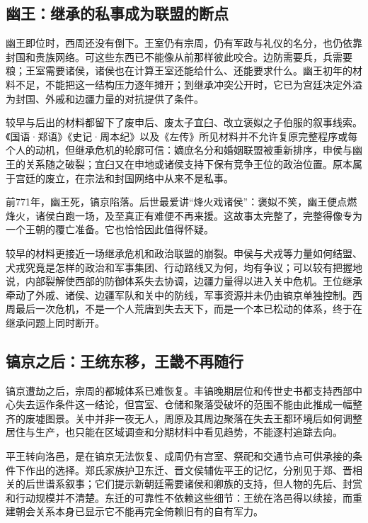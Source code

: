 \subsection{幽王：继承的私事成为联盟的断点}

幽王即位时，西周还没有倒下。王室仍有宗周，仍有军政与礼仪的名分，也仍依靠封国和贵族网络。可这些东西已不能像从前那样彼此咬合。边防需要兵，兵需要粮；王室需要诸侯，诸侯也在计算王室还能给什么、还能要求什么。幽王初年的材料不足，不能把这一结构压力逐年摊开；到继承冲突公开时，它已为宫廷决定外溢为封国、外戚和边疆力量的对抗提供了条件。

较早与后出的材料都留下了废申后、废太子宜臼、改立褒姒之子伯服的叙事线索。《国语·郑语》《史记·周本纪》以及《左传》所见材料并不允许复原完整程序或每个人的动机，但继承危机的轮廓可信：嫡庶名分和婚姻联盟被重新排序，申侯与幽王的关系随之破裂；宜臼又在申地或诸侯支持下保有竞争王位的政治位置。原本属于宫廷的废立，在宗法和封国网络中从来不是私事。


前771年，幽王死，镐京陷落。后世最爱讲“烽火戏诸侯”：褒姒不笑，幽王便点燃烽火，诸侯白跑一场，及至真正有难便不再来援。这故事太完整了，完整得像专为一个王朝的覆亡准备。它也恰恰因此值得怀疑。

较早的材料更接近一场继承危机和政治联盟的崩裂。申侯与犬戎等力量如何结盟、犬戎究竟是怎样的政治和军事集团、行动路线又为何，均有争议；可以较有把握地说，内部裂解使西部的防御体系失去协调，边疆力量得以进入关中危机。王位继承牵动了外戚、诸侯、边疆军队和关中的防线，军事资源并未仍由镐京单独控制。西周最后一次危机，不是一个人荒唐到失去天下，而是一个本已松动的体系，终于在继承问题上同时断开。

\subsection{镐京之后：王统东移，王畿不再随行}

镐京遭劫之后，宗周的都城体系已难恢复。丰镐晚期层位和传世史书都支持西部中心失去运作条件这一结论，但宫室、仓储和聚落受破坏的范围不能由此推成一幅整齐的废墟图景。关中并非一夜无人，周原及其周边聚落在失去王都环境后如何调整居住与生产，也只能在区域调查和分期材料中看见趋势，不能逐村追踪去向。

平王转向洛邑，是在镐京无法恢复、成周仍有宫室、祭祀和交通节点可供承接的条件下作出的选择。郑氏家族护卫东迁、晋文侯辅佐平王的记忆，分别见于郑、晋相关的后世谱系叙事；它们提示新朝廷需要诸侯和卿族的支持，但人物的先后、封赏和行动规模并不清楚。东迁的可靠性不依赖这些细节：王统在洛邑得以续接，而重建朝会关系本身已显示它不能再完全倚赖旧有的自有军力。

